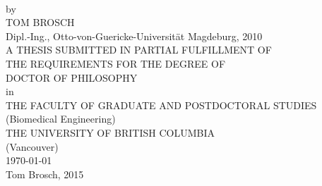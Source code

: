 \begin{titlepage}
\newlength{\smalltitlespace}
\newlength{\mediumtitlespace}
\newlength{\largetitlespace}
\setlength{\smalltitlespace}{1em}
\setlength{\mediumtitlespace}{1.5em}
\setlength{\largetitlespace}{3.5em}
\noindent
  \begin{center}
  \mbox{}\vfill
  \large\sffamily
  {\huge\bfseries\MakeUppercase{\longtitle}\\}\vspace{2em}
  by\\[1.5em]
  {\Large TOM BROSCH\\[\smalltitlespace]}
  {\Large Dipl.-Ing., Otto-von-Guericke-Universit\"at Magdeburg,
  2010\\[\largetitlespace]}
  {\Large A THESIS SUBMITTED IN PARTIAL
  FULFILLMENT OF\\
  THE REQUIREMENTS FOR THE DEGREE OF\\[\smalltitlespace]
  DOCTOR OF PHILOSOPHY\\[\smalltitlespace]}
  in\\[\smalltitlespace]
  {\Large THE FACULTY OF GRADUATE AND POSTDOCTORAL STUDIES\\[\smalltitlespace]
  (Biomedical Engineering)\\[\largetitlespace]}
  {\Large THE UNIVERSITY OF BRITISH COLUMBIA\\[\smalltitlespace]
  (Vancouver)\\[\largetitlespace]}
  \thesisdate\today\\[\smalltitlespace]
  {\rmfamily \textcopyright{}} Tom Brosch, 2015
  \end{center}
\end{titlepage}

